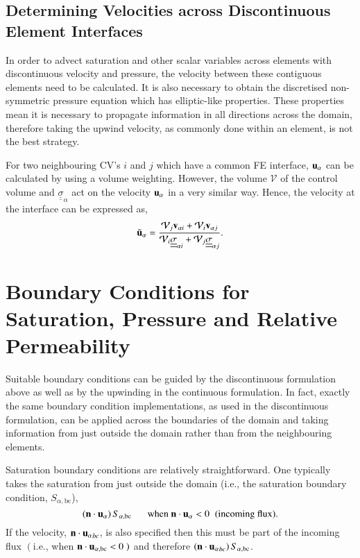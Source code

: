 \documentclass[preprint,authoryear,12pt]{elsarticle}
\newcommand{\frc}{\displaystyle\frac}
\begin{document}
\subsection{Determining Velocities across Discontinuous Element Interfaces}
In order to advect saturation and other scalar variables across elements with discontinuous velocity and pressure, the velocity between these contiguous elements need to be calculated. It is also necessary to obtain the discretised non-symmetric pressure equation which has elliptic-like properties. These properties mean it is necessary to propagate information in all directions across the domain, therefore taking the upwind velocity, as commonly done within an element, is not the best strategy.
 
For two neighbouring CV's $i$ and $j$ which have a common FE interface, ${\bf u}_{\alpha}$ can be calculated by using a volume weighting. However, the volume $\mathcal{V}$ of the control volume and $\underline{\underline{\sigma}}_{\alpha}$ act on the velocity ${\bf u}_{\alpha}$ in a very similar way. Hence, the velocity at the interface can be expressed as,
\begin{equation} 
  {\tilde{\bf u}_\alpha} = \frc{ \mathcal{V}_{j} {\bf v}_{\alpha i} + \mathcal{V}_{i} {\bf v}_{\alpha j}} { \mathcal{V}_{i} \underline{\underline{\sigma}}_{\alpha i} + \mathcal{V}_{j} \underline{\underline{\sigma}}_{\alpha j} }.
\end{equation} 

\section{Boundary Conditions for Saturation, Pressure and Relative Permeability}\label{bcs-rel-perm} 

Suitable boundary conditions can be guided by the discontinuous formulation above as well as by the upwinding in the continuous formulation. In fact, exactly the same boundary condition implementations, as used in the discontinuous formulation, can be applied across the boundaries of the domain and taking information from just outside the domain rather than from the neighbouring elements.

Saturation boundary conditions are relatively straightforward. One typically takes the saturation from just outside the domain (i.e., the saturation boundary condition, ${S_{\alpha, \text{bc}}}$),
\begin{displaymath}
\left({\bf n}\cdot {\bf u}_\alpha\right)S_{\alpha,\text{bc}}\;\;\;\;\;\text{ when } {\bf n}\cdot {\bf u}_{\alpha} < 0\;\;\text{(incoming flux)}.
\end{displaymath}
If the velocity, ${\bf n}\cdot {{\bf u}_\alpha}_{bc}$, is also specified then this must be part of the incoming flux $\left(\right.$i.e., when ${\bf n}\cdot {\bf u}_{\alpha,\text{bc}} < 0\left.\right)$ and therefore $\left({\bf n}\cdot {{\bf u}_\alpha}_{bc}\right)S_{\alpha,\text{bc}}$.
\end{document}
